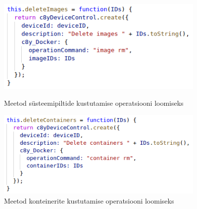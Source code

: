 \documentclass[12pt]{article}
\begin{document}
 \begin{figure} [ht]
  \centering
  \begin{minipage}{0.45\textwidth}
    \centering
    \includegraphics[width=0.9\textwidth]{webplugin_deleteimages} %
    \caption{Meetod süsteemipiltide kustutamise operatsiooni loomiseks}
    \label{fig:webplugin_deleteimages}
  \end{minipage}\hfill
  \begin{minipage}{0.45\textwidth}
    \centering
    \includegraphics[width=0.9\textwidth]{webplugin_deletecontainers} %
    \caption{Meetod konteinerite kustutamise operatsiooni loomiseks}
    \label{fig:webplugin_deletecontainers}
  \end{minipage}
 \end{figure}
\end{document}
